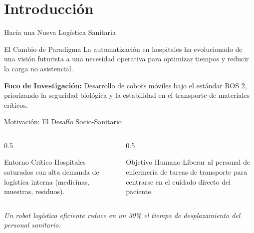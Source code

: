 
\section{Introducción}
\begin{frame}{Hacia una Nueva Logística Sanitaria}
    \begin{exampleblock}{El Cambio de Paradigma}
        La automatización en hospitales ha evolucionado de una visión futurista a una necesidad operativa para optimizar tiempos y reducir la carga no asistencial.
    \end{exampleblock}
    
    \vspace{0.5cm}
    \textbf{Foco de Investigación:}
    Desarrollo de cobots móviles bajo el estándar ROS 2, priorizando la seguridad biológica y la estabilidad en el transporte de materiales críticos.
\end{frame}

\begin{frame}{Motivación: El Desafío Socio-Sanitario}
    \begin{columns}
        \begin{column}{0.5\textwidth}
            \begin{block}{Entorno Crítico}
                Hospitales saturados con alta demanda de logística interna (medicinas, muestras, residuos).
            \end{block}
        \end{column}
        \begin{column}{0.5\textwidth}
            \begin{block}{Objetivo Humano}
                Liberar al personal de enfermería de tareas de transporte para centrarse en el cuidado directo del paciente.
            \end{block}
        \end{column}
    \end{columns}
    \vspace{0.4cm}
    \textit{Un robot logístico eficiente reduce en un 30\% el tiempo de desplazamiento del personal sanitario.}
\end{frame}

